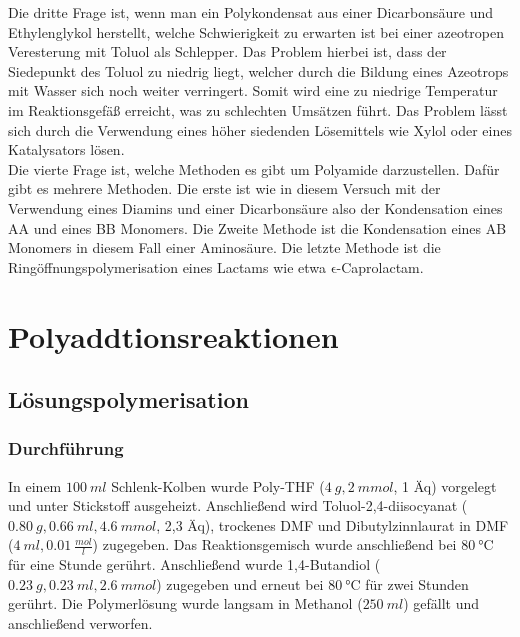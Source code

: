 \documentclass[12pt, bibliography=totocnumbered]{scrartcl}
\begin{document}
Die dritte Frage ist, wenn man ein Polykondensat aus einer Dicarbonsäure und Ethylenglykol herstellt, welche Schwierigkeit zu erwarten ist bei einer azeotropen Veresterung mit Toluol als Schlepper. Das Problem hierbei ist, dass der Siedepunkt des Toluol zu niedrig liegt, welcher durch die Bildung eines Azeotrops mit Wasser sich noch weiter verringert.
\newpage
Somit wird eine zu niedrige Temperatur im Reaktionsgefäß erreicht, was zu schlechten Umsätzen führt. Das Problem lässt sich durch die Verwendung eines höher siedenden Lösemittels wie Xylol oder eines Katalysators lösen.\\
Die vierte Frage ist, welche Methoden es gibt um Polyamide darzustellen. Dafür gibt es mehrere Methoden. Die erste ist wie in diesem Versuch mit der Verwendung eines Diamins und einer Dicarbonsäure also der Kondensation eines AA und eines BB Monomers. Die Zweite Methode ist die Kondensation eines AB Monomers in diesem Fall einer Aminosäure. Die letzte Methode ist die Ringöffnungspolymerisation eines Lactams wie etwa $\mathrm{\epsilon}$-Caprolactam. 



\section{Polyaddtionsreaktionen}
\subsection{Lösungspolymerisation}
\subsubsection{Durchführung}
In einem  $\SI{100}{ml}$ Schlenk-Kolben wurde Poly-THF ($\SI{4}{g},\SI{2}{mmol}$, 1 Äq) vorgelegt und unter Stickstoff ausgeheizt. Anschließend wird Toluol-2,4-diisocyanat ($\SI{0,80}{g},\SI{0,66}{ml},\SI{4,6}{mmol}$, 2,3 Äq), trockenes DMF und Dibutylzinnlaurat in DMF ($\SI{4}{ml},\SI{0,01}{\frac{mol}{l}}$) zugegeben. Das Reaktionsgemisch wurde anschließend bei $\SI{80}{\degree}$C für eine Stunde gerührt. Anschließend wurde 1,4-Butandiol ($\SI{0,23}{g},\SI{0,23}{ml},\SI{2,6}{mmol}$) zugegeben und erneut bei $\SI{80}{\degree}$C für zwei Stunden gerührt. Die Polymerlösung wurde langsam in Methanol ($\SI{250}{ml}$) gefällt und anschließend verworfen.
\newpage
\end{document}
